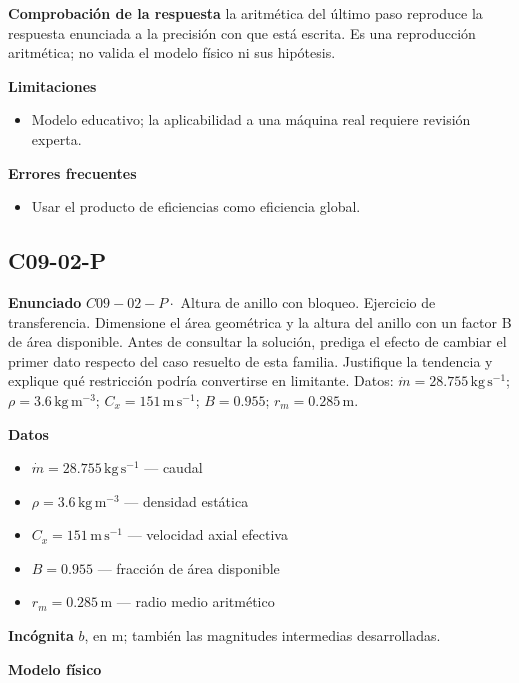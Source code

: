 \documentclass[10pt,openany]{book}
\begin{document}
\noindent\textbf{Comprobación de la respuesta} la aritmética del último paso reproduce la respuesta enunciada a la precisión con que está escrita. Es una reproducción aritmética; no valida el modelo físico ni sus hipótesis.

\noindent\textbf{Limitaciones}
\begin{itemize}
\item Modelo educativo; la aplicabilidad a una máquina real requiere revisión experta.
\end{itemize}

\noindent\textbf{Errores frecuentes}
\begin{itemize}
\item Usar el producto de eficiencias como eficiencia global.
\end{itemize}
\subsection*{C09-02-P}

\noindent\textbf{Enunciado}
\(C09-02-P \cdot\) Altura de anillo con bloqueo. Ejercicio de transferencia. Dimensione el área geométrica y la altura del anillo con un factor B de área disponible. Antes de consultar la solución, prediga el efecto de cambiar el primer dato respecto del caso resuelto de esta familia. Justifique la tendencia y explique qué restricción podría convertirse en limitante. Datos: \(\dot m=28.755\, \mathrm{kg}\,\mathrm{s}^{-1}\); \(\rho=3.6\, \mathrm{kg}\,\mathrm{m}^{-3}\); \(C_x=151\, \mathrm{m}\,\mathrm{s}^{-1}\); \(B=0.955\); \(r_m=0.285\, \mathrm{m}\).

\noindent\textbf{Datos}
\begin{itemize}
\item $\dot m = 28.755\,\mathrm{kg}\,\mathrm{s}^{-1}$ — caudal
\item $\rho = 3.6\,\mathrm{kg}\,\mathrm{m}^{-3}$ — densidad estática
\item $C_x = 151\,\mathrm{m}\,\mathrm{s}^{-1}$ — velocidad axial efectiva
\item $B = 0.955$ — fracción de área disponible
\item $r_m = 0.285\,\mathrm{m}$ — radio medio aritmético
\end{itemize}

\noindent\textbf{Incógnita}
$b$, en $\mathrm{m}$; también las magnitudes intermedias desarrolladas.

\noindent\textbf{Modelo físico}
\end{document}
